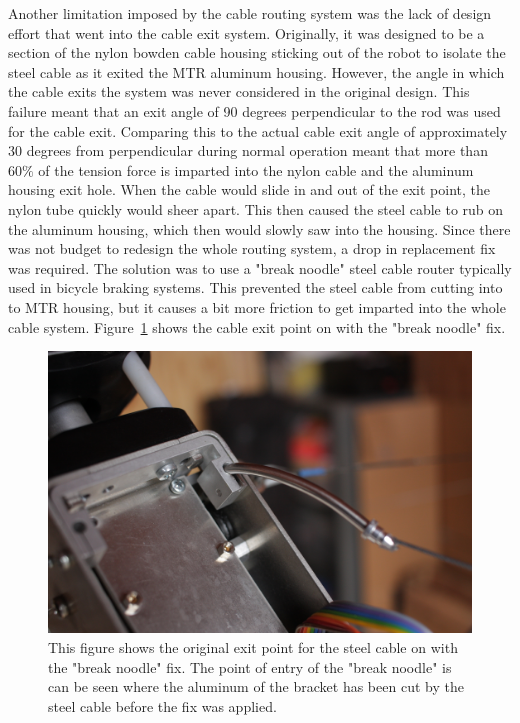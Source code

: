 \begin{appendices}
Another limitation imposed by the cable routing system was the lack of design effort that went into the cable exit system.
Originally, it was designed to be a section of the nylon bowden cable housing sticking out of the robot to isolate the steel cable as it exited the MTR aluminum housing.
However, the angle in which the cable exits the system was never considered in the original \SB{} design. 
This failure meant that an exit angle of 90 degrees perpendicular to the rod was used for the cable exit.
Comparing this to the actual cable exit angle of approximately 30 degrees from perpendicular during normal operation meant that more than \(60\%\) of the tension force is imparted into the nylon cable and the aluminum housing exit hole.
When the cable would slide in and out of the exit point, the nylon tube quickly would sheer apart.
This then caused the steel cable to rub on the aluminum housing, which then would slowly saw into the housing.
Since there was not budget to redesign the whole routing system, a drop in replacement fix was required. 
The solution was to use a "break noodle" steel cable router typically used in bicycle braking systems.
This prevented the steel cable from cutting into to MTR housing, but it causes a bit more friction to get imparted into the whole cable system.
Figure~\ref{fig:cable_output} shows the cable exit point on \SB{} with the "break noodle" fix.

\begin{figure}[thpb]
      \centering
      \includegraphics[width=0.8\columnwidth]{tex/img/bracket_cut}
      \caption{This figure shows the original exit point for the steel cable on \SB{} with the "break noodle" fix. The point of entry of the "break noodle" is can be seen where the aluminum of the bracket has been cut by the steel cable before the fix was applied.}
      \label{fig:cable_output}
\end{figure}


\end{appendices}
